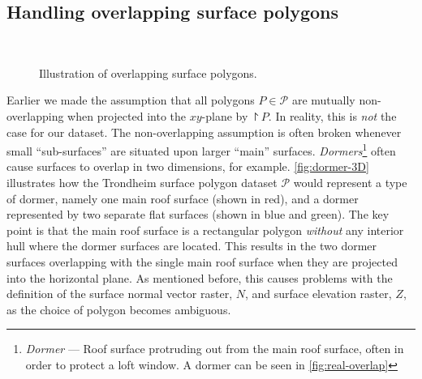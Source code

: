 \subsection{Handling overlapping surface polygons}%
\label{sec:overlapping-fix}

\begin{figure}
  \centering
  \hspace{3em}
  \\\vspace{1em}
  \hspace{3em}
  \caption{%
    Illustration of overlapping surface polygons.
  }
  \label{fig:overlapping-polygons}
\end{figure}
Earlier we made the assumption that all polygons $P \in \mathcal{P}$ are mutually non-overlapping when projected into the $xy$-plane by $\project{P}$.
In reality, this is \emph{not} the case for our dataset.
The non-overlapping assumption is often broken whenever small \enquote{sub-surfaces} are situated upon larger \enquote{main} surfaces.
\textit{Dormers}\footnote{\textit{Dormer} --- Roof surface protruding out from the main roof surface, often in order to protect a loft window. A dormer can be seen in \cref{fig:real-overlap}} often cause surfaces to overlap in two dimensions, for example.
\cref{fig:dormer-3D} illustrates how the Trondheim surface polygon dataset $\mathcal{P}$ would represent a type of dormer, namely one main roof surface (shown in \textcolor{red!80}{red}), and a dormer represented by two separate flat surfaces (shown in \textcolor{blue!80}{blue} and \textcolor{green!80}{green}).
The key point is that the main roof surface is a rectangular polygon \emph{without} any interior hull where the dormer surfaces are located.
This results in the two dormer surfaces overlapping with the single main roof surface when they are projected into the horizontal plane.
As mentioned before, this causes problems with the definition of the surface normal vector raster, $N$, and surface elevation raster, $Z$, as the choice of polygon becomes ambiguous.
